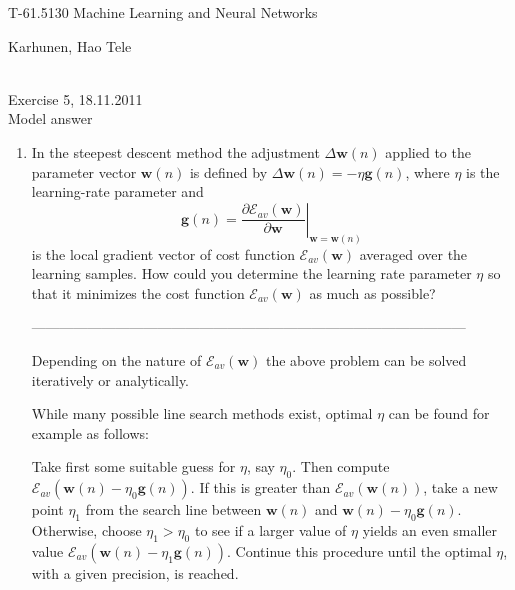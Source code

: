 \documentclass[10pt]{article}
\begin{document}
\pagestyle{empty}
\begin{Large}
\begin{bf} 
T-61.5130 Machine Learning and Neural Networks\\ 
\end{bf}
\end{Large}
Karhunen, Hao Tele\\  
\\
\begin{large}
\begin{bf}
Exercise 5,  18.11.2011\\Model answer
\end{bf}
\end{large}
\begin{enumerate}

\item In the steepest descent method the adjustment
$\Delta\mathbf{w}(n)$ applied to the parameter vector $\mathbf{w}(n)$
is defined by $\Delta\mathbf{w}(n)=-\eta\mathbf{g}(n)$, where $\eta$
is the learning-rate parameter and
\begin{equation*}
\mathbf{g}(n)=\left.\frac{\partial
\mathcal{E}_{av}(\mathbf{w})}{\partial \mathbf{w}}\right|_{\mathbf{w}=\mathbf{w}(n)}
\end{equation*}
is the local gradient vector of cost
function $\mathcal{E}_{av}(\mathbf{w})$ averaged over the learning
samples. How could you determine the learning rate parameter $\eta$ so
that it minimizes the cost function $\mathcal{E}_{av}(\mathbf{w})$ as much as possible?

---------------------------------------------------------------------------------------------

Depending on the nature of $\mathcal{E}_{av}(\mathbf{w})$ the above
problem can be solved iteratively or analytically.

While many possible line search methods exist,
optimal $\eta$ can be found for example as follows:

Take first some suitable guess for $\eta$, say $\eta_0$. Then compute
$\mathcal{E}_{av}(\mathbf{w}(n)-\eta_0\mathbf{g}(n))$. If this is
greater than $\mathcal{E}_{av}(\mathbf{w}(n))$, take a new point
$\eta_1$ from the search line between $\mathbf{w}(n)$ and
$\mathbf{w}(n)-\eta_0\mathbf{g}(n)$. Otherwise, choose $\eta_1>\eta_0$
to see if a larger value of $\eta$ yields an even smaller value
$\mathcal{E}_{av}(\mathbf{w}(n)-\eta_1\mathbf{g}(n))$. Continue this
procedure until the optimal $\eta$, with a given precision, is reached.


\end{enumerate}
\end{document}
